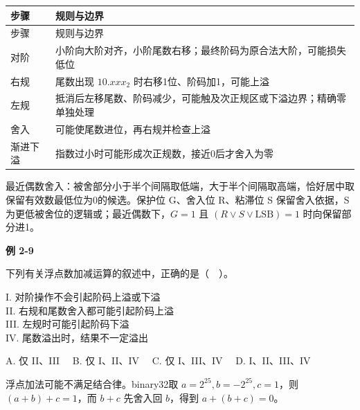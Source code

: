 \par\smallskip
{\fontsize{9.3}{12}\selectfont\setlength{\tabcolsep}{2.5pt}\setlength{\LTleft}{0pt}\setlength{\LTright}{0pt}
\begin{longtable}{@{}>{\raggedright\arraybackslash}p{}>{\raggedright\arraybackslash}p{}@{}}
\toprule
步骤 & 规则与边界 \\

\midrule\endfirsthead\toprule
步骤 & 规则与边界 \\

\midrule\endhead\bottomrule\endfoot
对阶 & 小阶向大阶对齐，小阶尾数右移；最终阶码为原合法大阶，可能损失低位 \\

右规 & 尾数出现 \(10.xxx_2\) 时右移1位、阶码加1，可能上溢 \\

左规 & 抵消后左移尾数、阶码减少，可能触及次正规区或下溢边界；精确零单独处理 \\

舍入 & 可能使尾数进位，再右规并检查上溢 \\

渐进下溢 & 指数过小时可能形成次正规数，接近0后才舍入为零 \\

\end{longtable}}
\par\smallskip

最近偶数舍入：被舍部分小于半个间隔取低端，大于半个间隔取高端，恰好居中取保留有效数最低位为0的候选。保护位 G、舍入位 R、粘滞位 S 保留舍入依据，S 为更低被舍位的逻辑或；最近偶数下，\(G=1\) 且 \((R\lor S\lor\mathrm{LSB})=1\) 时向保留部分进1。

\par\medskip{}\noindent\hypertarget{CO02-E09}{}\label{CO02-E09}\textbf{例 2-9}\par\nobreak\smallskip

下列有关浮点数加减运算的叙述中，正确的是（　）。

I. 对阶操作不会引起阶码上溢或下溢\\
II. 右规和尾数舍入都可能引起阶码上溢\\
III. 左规时可能引起阶码下溢\\
IV. 尾数溢出时，结果不一定溢出

A. 仅 II、III　 B. 仅 I、II、IV　 C. 仅 I、III、IV　 D. I、II、III、IV

浮点加法可能不满足结合律。binary32取 \(a=2^{25},b=-2^{25},c=1\)，则 \((a+b)+c=1\)，而 \(b+c\) 先舍入回 \(b\)，得到 \(a+(b+c)=0\)。


